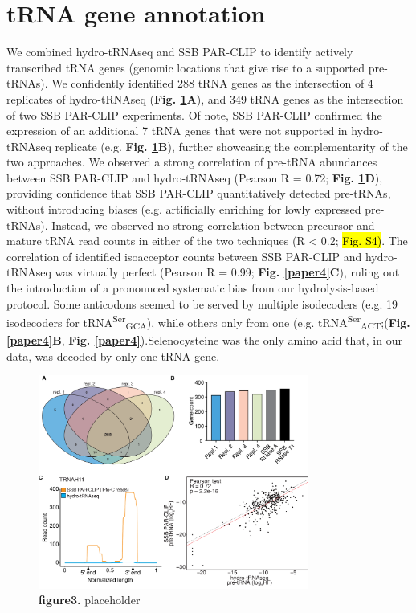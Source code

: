 \documentclass[12pt]{rockefeller}
\begin{document}
\section{tRNA gene annotation}
We combined hydro-tRNAseq and SSB PAR-CLIP to identify actively transcribed tRNA genes (genomic locations that give rise to a supported pre-tRNAs). We confidently identified 288 tRNA genes as the intersection of 4 replicates of hydro-tRNAseq (\textbf{Fig. \ref{paper3}A}), and 349 tRNA genes as the intersection of two SSB PAR-CLIP experiments. Of note, SSB PAR-CLIP confirmed the expression of an additional 7 tRNA genes that were not supported in hydro-tRNAseq replicate (e.g. \textbf{Fig. \ref{paper3}B}), further showcasing the complementarity of the two approaches. We observed a strong correlation of pre-tRNA abundances between SSB PAR-CLIP and hydro-tRNAseq (Pearson R = 0.72; \textbf{Fig. \ref{paper3}D}), providing confidence that SSB PAR-CLIP quantitatively detected pre-tRNAs, without introducing biases (e.g. artificially enriching for lowly expressed pre-tRNAs). Instead, we observed no strong correlation between precursor and mature tRNA read counts in either of the two techniques (R < 0.2; \hl{Fig. S4)}. The correlation of identified isoacceptor counts between SSB PAR-CLIP and hydro-tRNAseq was virtually perfect (Pearson R = 0.99; \textbf{Fig. \ref{paper4}C}), ruling out the introduction of a pronounced systematic bias from our hydrolysis-based protocol. Some anticodons seemed to be served by multiple isodecoders (e.g. 19 isodecoders for tRNA\textsuperscript{Ser}\textsubscript{GCA}), while others only from one (e.g. tRNA\textsuperscript{Ser}\textsubscript{ACT};(\textbf{Fig. \ref{paper4}B}, \textbf{Fig. \ref{paper4}}).Selenocysteine was the only amino acid that, in our data, was decoded by only one tRNA gene.

\begin{figure}[!ht]%
\centering
\includegraphics[width=3.5in]{paper3.png}%
\caption[figure3]
{\textbf{figure3.}
placeholder}
\centering
\label{paper3}%
\end{figure}
\end{document}
